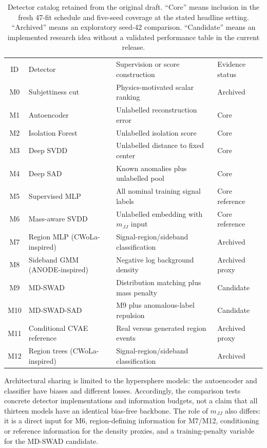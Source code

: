 \documentclass[reprint,aps,pra,amsmath,amssymb,floatfix,raggedbottom]{revtex4-2}
\newcommand{\mjj}{m_{JJ}}
\begin{document}
\begin{table}[tbp]
\caption{Detector catalog retained from the original draft. ``Core'' means inclusion in the fresh 47-fit schedule and five-seed coverage at the stated headline setting. ``Archived'' means an exploratory seed-42 comparison. ``Candidate'' means an implemented research idea without a validated performance table in the current release.}\label{tab:models}
\begin{ruledtabular}\begin{tabular}{clll}
ID & Detector & Supervision or score construction & Evidence status\\
M0 & Subjettiness cut & Physics-motivated scalar ranking & Archived\\
M1 & Autoencoder & Unlabelled reconstruction error & Core\\
M2 & Isolation Forest & Unlabelled isolation score & Core\\
M3 & Deep SVDD & Unlabelled distance to fixed center & Core\\
M4 & Deep SAD & Known anomalies plus unlabelled pool & Core\\
M5 & Supervised MLP & All nominal training signal labels & Core reference\\
M6 & Mass-aware SVDD & Unlabelled embedding with $\mjj$ input & Core reference\\
M7 & Region MLP (CWoLa-inspired) & Signal-region/sideband classification & Archived\\
M8 & Sideband GMM (ANODE-inspired) & Negative log background density & Archived proxy\\
M9 & MD-SWAD & Distribution matching plus mass penalty & Candidate\\
M10 & MD-SWAD-SAD & M9 plus anomalous-label repulsion & Candidate\\
M11 & Conditional CVAE reference & Real versus generated region events & Archived proxy\\
M12 & Region trees (CWoLa-inspired) & Signal-region/sideband classification & Archived
\end{tabular}\end{ruledtabular}
\end{table}

Architectural sharing is limited to the hypersphere models: the autoencoder and classifier have biases and different losses. Accordingly, the comparison tests concrete detector implementations and information budgets, not a claim that all thirteen models have an identical bias-free backbone. The role of $\mjj$ also differs: it is a direct input for M6, region-defining information for M7/M12, conditioning or reference information for the density proxies, and a training-penalty variable for the MD-SWAD candidate.
\end{document}
